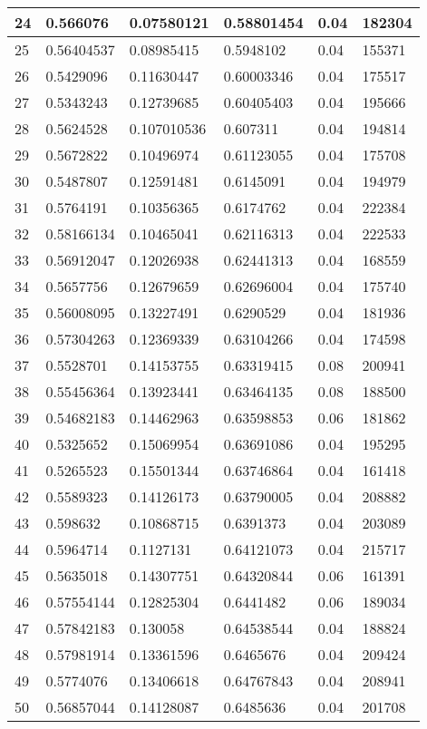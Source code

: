 \begin{longtable}{|l|l|l|l|l|l|}
24 & 0.566076 & 0.07580121 & 0.58801454 & 0.04 & 182304 \\ \hline 
25 & 0.56404537 & 0.08985415 & 0.5948102 & 0.04 & 155371 \\ \hline 
26 & 0.5429096 & 0.11630447 & 0.60003346 & 0.04 & 175517 \\ \hline 
27 & 0.5343243 & 0.12739685 & 0.60405403 & 0.04 & 195666 \\ \hline 
28 & 0.5624528 & 0.107010536 & 0.607311 & 0.04 & 194814 \\ \hline 
29 & 0.5672822 & 0.10496974 & 0.61123055 & 0.04 & 175708 \\ \hline 
30 & 0.5487807 & 0.12591481 & 0.6145091 & 0.04 & 194979 \\ \hline 
31 & 0.5764191 & 0.10356365 & 0.6174762 & 0.04 & 222384 \\ \hline 
32 & 0.58166134 & 0.10465041 & 0.62116313 & 0.04 & 222533 \\ \hline 
33 & 0.56912047 & 0.12026938 & 0.62441313 & 0.04 & 168559 \\ \hline 
34 & 0.5657756 & 0.12679659 & 0.62696004 & 0.04 & 175740 \\ \hline 
35 & 0.56008095 & 0.13227491 & 0.6290529 & 0.04 & 181936 \\ \hline 
36 & 0.57304263 & 0.12369339 & 0.63104266 & 0.04 & 174598 \\ \hline 
37 & 0.5528701 & 0.14153755 & 0.63319415 & 0.08 & 200941 \\ \hline 
38 & 0.55456364 & 0.13923441 & 0.63464135 & 0.08 & 188500 \\ \hline 
39 & 0.54682183 & 0.14462963 & 0.63598853 & 0.06 & 181862 \\ \hline 
40 & 0.5325652 & 0.15069954 & 0.63691086 & 0.04 & 195295 \\ \hline 
41 & 0.5265523 & 0.15501344 & 0.63746864 & 0.04 & 161418 \\ \hline 
42 & 0.5589323 & 0.14126173 & 0.63790005 & 0.04 & 208882 \\ \hline 
43 & 0.598632 & 0.10868715 & 0.6391373 & 0.04 & 203089 \\ \hline 
44 & 0.5964714 & 0.1127131 & 0.64121073 & 0.04 & 215717 \\ \hline 
45 & 0.5635018 & 0.14307751 & 0.64320844 & 0.06 & 161391 \\ \hline 
46 & 0.57554144 & 0.12825304 & 0.6441482 & 0.06 & 189034 \\ \hline 
47 & 0.57842183 & 0.130058 & 0.64538544 & 0.04 & 188824 \\ \hline 
48 & 0.57981914 & 0.13361596 & 0.6465676 & 0.04 & 209424 \\ \hline 
49 & 0.5774076 & 0.13406618 & 0.64767843 & 0.04 & 208941 \\ \hline 
50 & 0.56857044 & 0.14128087 & 0.6485636 & 0.04 & 201708 \\ \hline 
\end{longtable}